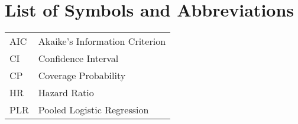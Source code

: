 \chapter*{List of Symbols and Abbreviations}\label{RefSymbols}
  \begin{longtable}{lp{}}
    AIC \dotfill & Akaike's Information Criterion \\
    CI \dotfill & Confidence Interval \\
    CP \dotfill & Coverage Probability \\
    HR \dotfill & Hazard Ratio \\
	PLR \dotfill & Pooled Logistic Regression\\
\end{longtable}